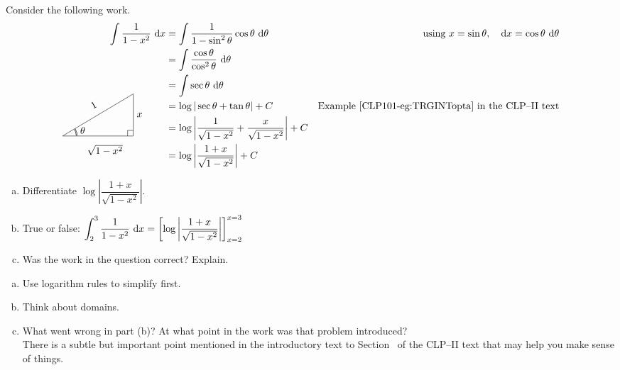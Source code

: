 \begin{Mquestion}
Consider the following work.
\color{blue}
\begin{align*}
\int \frac{1}{1-x^2}~\dee{x}&=\int\dfrac{1}{1-\sin^2 \theta}\cos\theta~\dee{\theta}&\mbox{using } x=\sin\theta,\quad \dee{x}=\cos\theta~\dee{\theta}\\
&=\int \frac{\cos \theta}{\cos^2 \theta}~\dee\theta\\
&=\int \sec \theta~\dee{\theta}\\
&=\log|\sec \theta + \tan \theta| +C & \mbox{Example~\eref{CLP101}{eg:TRGINTopta} in the CLP--II text}\\
&=\log\left |
\dfrac{1}{\sqrt{1-x^2}}+\dfrac{x}{\sqrt{1-x^2}}
\right| +C\\
\smash{\trigtri{\theta}{\sqrt{1-x^2}}{x}{1}}\qquad&=\log\left |
\dfrac{1+x}{\sqrt{1-x^2}}
\right| +C
\end{align*}
\color{black}
\begin{enumerate}[(a)]
\item Differentiate $\log\left|  \dfrac{1+x}{\sqrt{1-x^2}}\right|$.
\item True or false: $\displaystyle\int_{2}^{3} \frac{1}{1-x^2}~\mathrm{d}x =
\left[\log\left|  \dfrac{1+x}{\sqrt{1-x^2}}\right|\right]_{x=2}^{x=3}$
\item Was the work in the question correct? Explain.
\end{enumerate}
\end{Mquestion}
\begin{hint}
\begin{enumerate}[(a)]
\item Use logarithm rules to simplify first.
\item Think about domains.
\item What went wrong in part (b)? At what point in the work was that problem introduced?\\
There is a subtle but important point mentioned in the introductory text to Section~ of the CLP--II text that may help you make sense of things.
\end{enumerate}
\end{hint}
